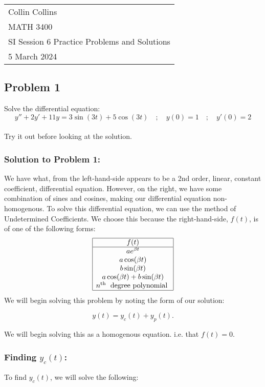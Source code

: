 \documentclass[a4paper,12pt]{article}
\begin{document}

\thispagestyle{empty}
\begin{tabular}{p{15.5cm}}
\\ Collin Collins \\
MATH 3400\\
SI Session 6 Practice Problems and Solutions\\
5 March 2024 \\
\hline

\end{tabular} 

\subsection*{Problem 1} Solve the differential equation:
$$ y'' + 2y' + 11y = 3\sin(3t) + 5\cos(3t) \quad ; \quad y(0)=1 \quad;\quad y'\left(0\right)=2 $$
\\
 
Try it out before looking at the solution.
\pagebreak
 
 \subsubsection*{Solution to Problem 1:}
 We have what, from the left-hand-side appears to be a 2nd order, linear, constant coefficient, differential equation. However, on the right, we have some combination of sines and cosines, making our differential equation non-homogenous. To solve this differential equation, we can use the method of Undetermined Coefficients. We choose this because the right-hand-side, $f(t)$, is of one of the following forms:
 $$ \begin{array}{|c|}
\hline f(t) \\
\hline a e^{\beta t} \\
a \cos (\beta t) \\
b \sin (\beta t) \\
a \cos (\beta t)+b \sin (\beta t) \\
n^{\text {th }} \text { degree polynomial } \\
\hline 
\end{array} $$
We will begin solving this problem by noting the form of our solution: 

$$ y(t) = y_c(t) + y_p(t). $$

We will begin solving this as a homogenous equation. i.e. that $f(t)=0.$
\subsubsection*{Finding $y_c(t)$:}
To find $y_c(t)$, we will solve the following:
\end{document}
